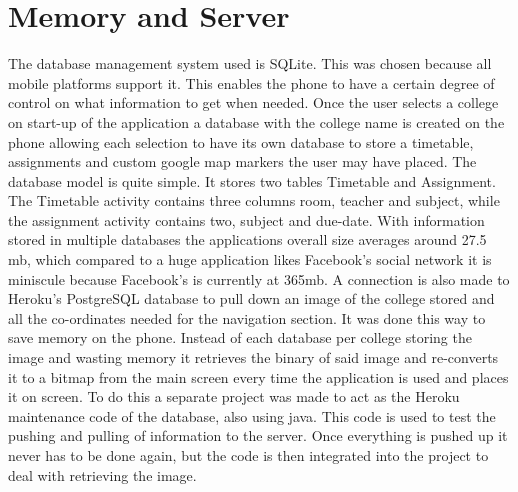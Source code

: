 \section{Memory and Server}
The database management system used is SQLite. This was chosen because all mobile platforms support it. This enables the phone to have a certain degree of control on what information to get when needed. Once the user selects a college on start-up of the application a database with the college name is created on the phone allowing each selection to have its own database to store a timetable, assignments and custom google map markers the user may have placed. The database model is quite simple. It stores two tables Timetable and Assignment. The Timetable activity contains three columns room, teacher and subject, while the assignment activity contains two, subject and due-date. With information stored in multiple databases the applications overall size averages around 27.5 mb, which compared to a huge application likes Facebook's social network it is miniscule because Facebook's is currently at 365mb. 
A connection is also made to Heroku's PostgreSQL database to pull down an image of the college stored and all the co-ordinates needed for the navigation section. It was done this way to save memory on the phone. Instead of each database per college storing the image and wasting memory it retrieves the binary of said image and re-converts it to a bitmap from the main screen every time the application is used and places it on screen. To do this a separate project was made to act as the Heroku maintenance code of the database, also using java. This code is used to test the pushing and pulling of information to the server. Once everything is pushed up it never has to be done again, but the code is then integrated into the project to deal with retrieving the image.

